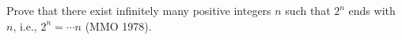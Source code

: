 Prove that there exist infinitely many positive integers $n$ such that $2^n$ ends with $n$, i.e., $2^n = \cdots n$ (MMO 1978).
